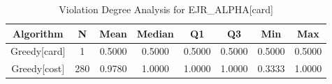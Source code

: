 

\begin{table}[h]
\centering
\begin{tabular}{cccccccc}
\toprule
Algorithm & N & Mean & Median & Q1 & Q3 & Min & Max \\
\midrule
Greedy[card] & 1 & 0.5000 & 0.5000 & 0.5000 & 0.5000 & 0.5000 & 0.5000 \\
Greedy[cost] & 280 & 0.9780 & 1.0000 & 1.0000 & 1.0000 & 0.3333 & 1.0000 \\
\bottomrule
\end{tabular}
\caption{Violation Degree Analysis for EJR\_ALPHA[card]}
\label{tab:analyze_ejr_violations_by_utility_1}
\end{table}
